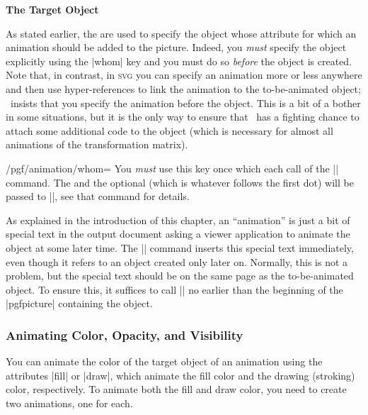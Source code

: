 \begin{command}{\pgfanimateattribute{}}
  \medskip
  \textbf{The Target Object}

  As stated earlier, the  are used to specify the object
  whose attribute for which an animation should be added to the
  picture. Indeed, you \emph{must} specify the object explicitly using
  the |whom| key and you must do so \emph{before} the object is
  created. Note that, in contrast, in \textsc{svg} you can specify an
  animation more or less anywhere and then use hyper-references to
  link the animation to the to-be-animated object; \pgfname\ insists
  that you specify the animation before the object. This is a bit of a
  bother in some situations, but it is the only way to ensure that
  \pgfname\ has a fighting chance to attach some additional code to
  the object (which is necessary for almost all animations of the
  transformation matrix).

  \begin{key}{/pgf/animation/whom=}
    You \emph{must} use this key once which each call of the
    |\pgfanimateattribute| command. The  and the optional
     (which is whatever follows the first dot) will be
    passed to |\pgfidrefnextuse|, see that command for details. 
  \end{key}

  As explained in the introduction of this chapter, an ``animation''
  is just a bit of special text in the output document asking a viewer
  application to animate the object at some later time. The
  |\pgfanimateattribute| command inserts this special text immediately,
  even though it refers to an object created only later on. Normally,
  this is not a problem, but the special text should be on the same
  page as the to-be-animated object. To ensure this, it suffices to
  call |\pgfanimateattribute| no earlier than the beginning of the
  |pgfpicture| containing the object.
\end{command}


\subsubsection{Animating Color, Opacity, and Visibility}
\label{section-base-animation-painting}

You can animate the color of the target object of an animation using
the attributes |fill| or |draw|, which animate the fill color and the
drawing (stroking) color, respectively. To animate both the fill and
draw color, you need to create two animations, one for each.

